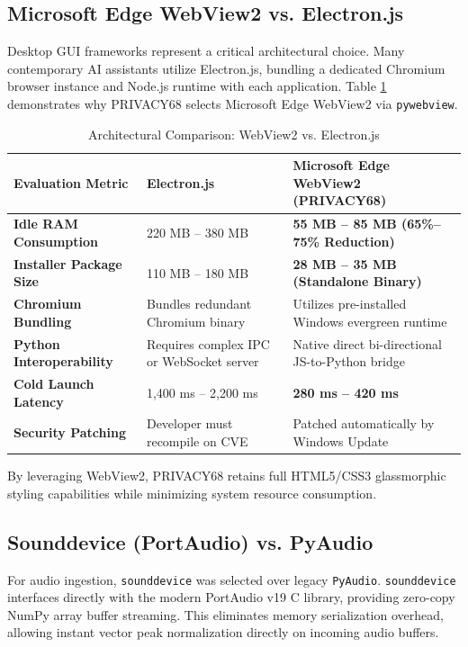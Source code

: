 \subsection{Microsoft Edge WebView2 vs. Electron.js}
Desktop GUI frameworks represent a critical architectural choice. Many contemporary AI assistants utilize Electron.js, bundling a dedicated Chromium browser instance and Node.js runtime with each application. Table \ref{tab:webview2_vs_electron} demonstrates why PRIVACY68 selects Microsoft Edge WebView2 via \texttt{pywebview}.

\begin{table}[htbp]
\centering
\small
\caption{Architectural Comparison: WebView2 vs. Electron.js}
\label{tab:webview2_vs_electron}
\begin{tabularx}{\textwidth}{|p{3.5cm}|X|X|}
\hline
\textbf{Evaluation Metric} & \textbf{Electron.js} & \textbf{Microsoft Edge WebView2 (PRIVACY68)} \\ \hline
\textbf{Idle RAM Consumption} & 220 MB -- 380 MB & \textbf{55 MB -- 85 MB (65\%--75\% Reduction)} \\ \hline
\textbf{Installer Package Size} & 110 MB -- 180 MB & \textbf{28 MB -- 35 MB (Standalone Binary)} \\ \hline
\textbf{Chromium Bundling} & Bundles redundant Chromium binary & Utilizes pre-installed Windows evergreen runtime \\ \hline
\textbf{Python Interoperability} & Requires complex IPC or WebSocket server & Native direct bi-directional JS-to-Python bridge \\ \hline
\textbf{Cold Launch Latency} & 1,400 ms -- 2,200 ms & \textbf{280 ms -- 420 ms} \\ \hline
\textbf{Security Patching} & Developer must recompile on CVE & Patched automatically by Windows Update \\ \hline
\end{tabularx}
\end{table}

By leveraging WebView2, PRIVACY68 retains full HTML5/CSS3 glassmorphic styling capabilities while minimizing system resource consumption.

\subsection{Sounddevice (PortAudio) vs. PyAudio}
For audio ingestion, \texttt{sounddevice} was selected over legacy \texttt{PyAudio}. \texttt{sounddevice} interfaces directly with the modern PortAudio v19 C library, providing zero-copy NumPy array buffer streaming. This eliminates memory serialization overhead, allowing instant vector peak normalization directly on incoming audio buffers.

